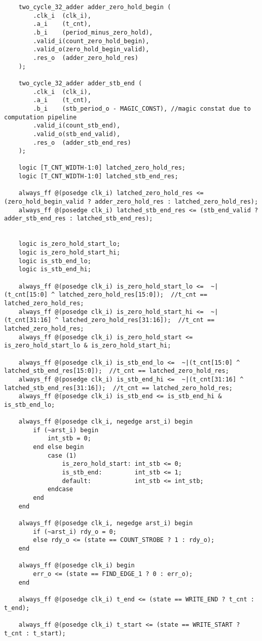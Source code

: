 \begin{lstlisting}
	two_cycle_32_adder adder_zero_hold_begin (
		.clk_i 	(clk_i),
		.a_i	(t_cnt),
		.b_i	(period_minus_zero_hold),
		.valid_i(count_zero_hold_begin),
		.valid_o(zero_hold_begin_valid),
		.res_o	(adder_zero_hold_res)
	);

	two_cycle_32_adder adder_stb_end (
		.clk_i 	(clk_i),
		.a_i	(t_cnt),
		.b_i	(stb_period_o - MAGIC_CONST), //magic constat due to computation pipeline
		.valid_i(count_stb_end),
		.valid_o(stb_end_valid),
		.res_o	(adder_stb_end_res)
	);

	logic [T_CNT_WIDTH-1:0] latched_zero_hold_res;
	logic [T_CNT_WIDTH-1:0] latched_stb_end_res;

	always_ff @(posedge clk_i) latched_zero_hold_res <= (zero_hold_begin_valid ? adder_zero_hold_res : latched_zero_hold_res);
	always_ff @(posedge clk_i) latched_stb_end_res <= (stb_end_valid ? adder_stb_end_res : latched_stb_end_res);

 
	logic is_zero_hold_start_lo;
	logic is_zero_hold_start_hi;
	logic is_stb_end_lo;
	logic is_stb_end_hi;

	always_ff @(posedge clk_i) is_zero_hold_start_lo <=  ~|(t_cnt[15:0] ^ latched_zero_hold_res[15:0]);  //t_cnt == latched_zero_hold_res;
	always_ff @(posedge clk_i) is_zero_hold_start_hi <=  ~|(t_cnt[31:16] ^ latched_zero_hold_res[31:16]);  //t_cnt == latched_zero_hold_res;
	always_ff @(posedge clk_i) is_zero_hold_start <= is_zero_hold_start_lo & is_zero_hold_start_hi; 

	always_ff @(posedge clk_i) is_stb_end_lo <=  ~|(t_cnt[15:0] ^ latched_stb_end_res[15:0]);  //t_cnt == latched_zero_hold_res;
	always_ff @(posedge clk_i) is_stb_end_hi <=  ~|(t_cnt[31:16] ^ latched_stb_end_res[31:16]);  //t_cnt == latched_zero_hold_res;
	always_ff @(posedge clk_i) is_stb_end <= is_stb_end_hi & is_stb_end_lo; 

	always_ff @(posedge clk_i, negedge arst_i) begin
		if (~arst_i) begin
			int_stb = 0;
		end else begin
			case (1) 
				is_zero_hold_start: int_stb <= 0;
				is_stb_end:			int_stb <= 1;
				default:			int_stb <= int_stb;
			endcase
		end
	end

	always_ff @(posedge clk_i, negedge arst_i) begin
		if (~arst_i) rdy_o = 0;
		else rdy_o <= (state == COUNT_STROBE ? 1 : rdy_o);
	end

	always_ff @(posedge clk_i) begin
		err_o <= (state == FIND_EDGE_1 ? 0 : err_o);
	end

	always_ff @(posedge clk_i) t_end <= (state == WRITE_END ? t_cnt : t_end);

	always_ff @(posedge clk_i) t_start <= (state == WRITE_START ? t_cnt : t_start);


\end{lstlisting}
